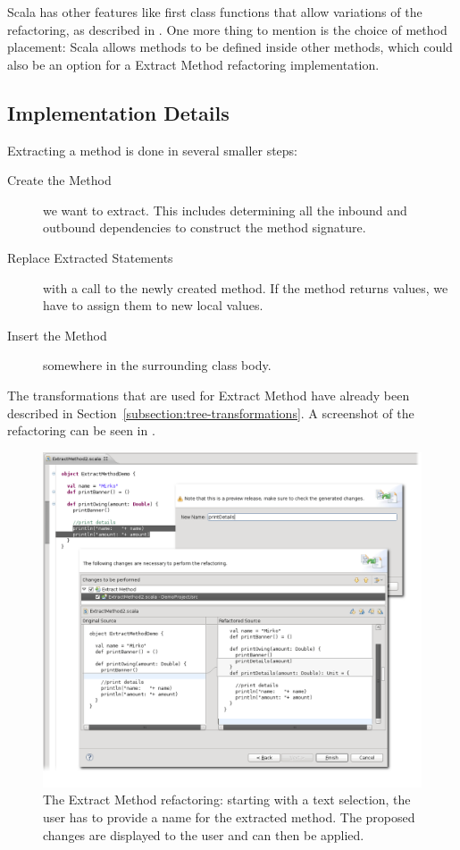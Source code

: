 \documentclass[10pt,a4paper,oneside]{scrreprt}
\begin{document}
Scala has other features like first class functions that allow variations of the refactoring, as described in \cite{ScalaRefactoring}. One more thing to mention is the choice of method placement: Scala allows methods to be defined inside other methods, which could also be an option for a Extract Method refactoring implementation.

\subsection{Implementation Details}

Extracting a method is done in several smaller steps:

\begin{description}
  \item[Create the Method] we want to extract. This includes determining all the inbound and outbound dependencies to construct the method signature.
  \item[Replace Extracted Statements] with a call to the newly created method. If the method returns values, we have to assign them to new local values.
  \item[Insert the Method] somewhere in the surrounding class body.
\end{description}

The transformations that are used for Extract Method have already been described in Section~\vref{subsection:tree-transformations}. A screenshot of the refactoring can be seen in .

\begin{figure}
  \centering
  \includegraphics[width=\linewidth]{extract_method_screenshot_1.png}
  \caption{The Extract Method refactoring: starting with a text selection, the user has to provide a name for the extracted method. The proposed changes are displayed to the user and can then be applied.}
  \label{figure:extract-method-screenshot-1}
\end{figure}
\end{document}
